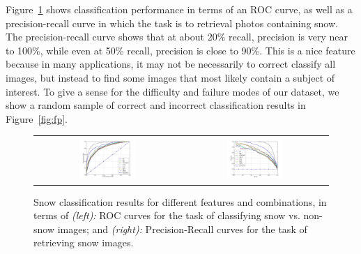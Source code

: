 Figure~\ref{fig:PR_ROC_snow} shows classification performance in
terms of an ROC curve, as well as a
precision-recall curve in which the task is to retrieval photos
containing snow. The precision-recall curve shows that at about 20\%
recall, precision is very near to 100\%, while even at 50\% recall,
precision is close to 90\%.  This is a nice feature because in many
applications, it may not be necessarily to correct classify all
images, but instead to find some images that most likely contain a
subject of interest.
%
To give a sense for the difficulty and failure modes of our dataset,
we show a random sample of correct and incorrect classification results
in Figure~\ref{fig:fp}.

\begin{figure}[th!]
\begin{center}
\vspace{-16pt}
\begin{tabular}{cc}
 \includegraphics[width=0.4\textwidth]{figs/ROC-CNN-curves.jpg} &
\includegraphics[width=0.4\textwidth]{figs/PR-CNN-curves.jpg} \\
\end{tabular}
\end{center}
\vspace{-8pt}
\caption{
Snow classification results for different features and combinations, in terms of {\textit{(left):}} ROC curves for the task of classifying snow vs. non-snow images; and 
{\textit{(right):}} Precision-Recall curves for the task of retrieving snow images.
}
\label{fig:PR_ROC_snow}
\end{figure}
%
